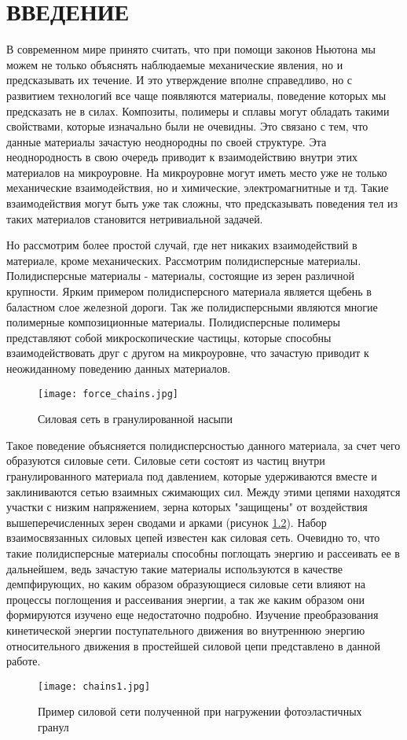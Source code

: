 \chapter{ВВЕДЕНИЕ}

В современном мире принято считать, что при помощи законов Ньютона мы можем не только объяснять наблюдаемые механические явления, но и предсказывать их
течение. И это утверждение вполне справедливо, но с развитием технологий все чаще появляются материалы, поведение которых мы предсказать не в силах. 
Композиты, полимеры и сплавы могут обладать такими свойствами, которые изначально были не очевидны. Это связано с тем, что данные материалы зачастую 
неоднородны по своей структуре. Эта неоднородность в свою очередь приводит к взаимодействию внутри этих материалов на микроуровне. На микроуровне могут 
иметь место уже не только механические взаимодействия, но и химические, электромагнитные и тд. Такие взаимодействия могут быть уже так сложны, что предсказывать 
поведения тел из таких материалов становится нетривиальной задачей. 

Но рассмотрим более простой случай, где нет никаких взаимодействий в материале, кроме механических. Рассмотрим полидисперсные материалы. 
Полидисперсные материалы - материалы, состоящие из зерен различной крупности. Ярким примером полидисперсного материала является щебень в баластном слое
железной дороги. Так же полидисперсными являются многие полимерные композиционные материалы. Полидисперсные полимеры представляют собой микроскопические 
частицы, которые способны взаимодействовать друг с другом на микроуровне, что зачастую приводит к неожиданному поведению данных материалов.

\begin{figure}[h]
    \centering
    \texttt{[image: force\_chains.jpg]}
    \caption{Силовая сеть в гранулированной насыпи}
    \label{fig:chainheap}
\end{figure}

Такое поведение объясняется полидисперсностью данного материала, за счет чего образуются силовые сети. Силовые сети состоят
из частиц внутри гранулированного материала под давлением, которые удерживаются вместе и заклиниваются сетью взаимных сжимающих сил. 
Между этими цепями находятся участки с низким напряжением, зерна которых "защищены" от воздействия вышеперечисленных зерен сводами и арками (рисунок \ref{fig:chainheap}). 
Набор взаимосвязанных силовых цепей известен как силовая сеть. Очевидно то, что такие полидисперсные материалы способны поглощать энергию и рассеивать ее
в дальнейшем, ведь зачастую такие материалы используются в качестве демпфирующих, но каким образом образующиеся силовые сети влияют на процессы поглощения 
и рассеивания энергии, а так же каким образом они формируются изучено еще недостаточно подробно. Изучение преобразования кинетической энергии поступательного
движения во внутреннюю энергию относительного движения в простейшей силовой цепи  представлено в данной работе.

\begin{figure}[h]
    \centering
    \texttt{[image: chains1.jpg]}
    \caption{Пример силовой сети полученной при нагружении фотоэластичных гранул}
    \label{fig:chainheap}
\end{figure}